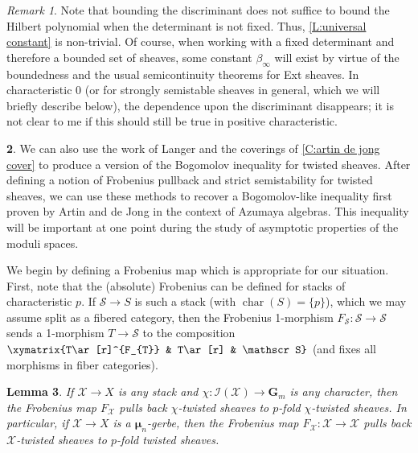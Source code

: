 \documentclass[11pt]{amsart}
\newcommand{\field}[1]{\mathbf #1}
\newcommand{\ms}[1]{\mathscr #1}
\newcommand{\m}{\boldsymbol{\mu}}
\newcommand{\G}{\field G} %
\newcommand{\ch}{\operatorname{char}}
\renewcommand{\[}{[\!\hspace{0.03em}[}
\renewcommand{\]}{]\!\hspace{0.03em}]}
\renewcommand{\(}{(\!\hspace{0.03em}(}
\renewcommand{\)}{)\!\hspace{0.03em})}
\newtheorem{lem}{Lemma}[subsubsection]%
\theoremstyle{definition}
\newtheorem{para}[lem]{\indent}
\theoremstyle{remark}
\newtheorem{remark}[lem]{Remark}
\begin{document}
\begin{remark} Note that bounding the discriminant does not suffice 
to bound the Hilbert polynomial when the determinant is not fixed.  
Thus, \ref{L:universal constant} is non-trivial.  Of course, when 
working with a fixed determinant and therefore a bounded set of 
sheaves, some constant $\beta_{\infty}$ will exist by virtue of the 
boundedness and the usual semicontinuity theorems for Ext sheaves.  
In characteristic 0 (or for strongly semistable sheaves in general, 
which we will briefly describe below), the dependence upon the discriminant disappears; 
it is not clear to me if this should still be true in positive 
characteristic.
\end{remark}

\begin{para} We can also use the work of Langer and the coverings of 
\ref{C:artin de jong cover} to produce a version of the Bogomolov 
inequality for twisted sheaves.  After defining a notion of Frobenius 
pullback and strict semistability for twisted sheaves, we can use these 
methods to recover a Bogomolov-like inequality first proven by Artin 
and de Jong in the context of Azumaya algebras.  This inequality will 
be important at one point during the study of asymptotic properties 
of the moduli spaces.

We begin by defining a Frobenius map which is appropriate for our 
situation.  First, note that the (absolute) Frobenius can be defined for 
stacks of characteristic $p$.  If $\ms S\to S$ is such a stack (with 
$\ch(S)=\{p\}$), which we may assume split 
as a fibered category, then the Frobenius 
1-morphism $F_{\ms S}:\ms S\to\ms S$ sends a 1-morphism $T\to\ms S$ to the 
composition $\xymatrix{T\ar[r]^{F_{T}} & T\ar[r] & \ms S}$ (and fixes all 
morphisms in fiber categories).
\end{para}
\begin{lem} If $\ms X\to X$ is any stack and $\chi:\ms I(\ms 
X)\to\G_{m}$ is any character, then the Frobenius map $F_{\ms X}$ 
pulls back $\chi$-twisted sheaves to $p$-fold $\chi$-twisted sheaves.
In particular, if $\ms X\to X$ is a $\m_{n}$-gerbe, then  
the Frobenius map $F_{\ms X}:\ms X\to\ms X$ pulls back $\ms X$-twisted 
sheaves to $p$-fold twisted sheaves.
\end{lem}
\end{document}
